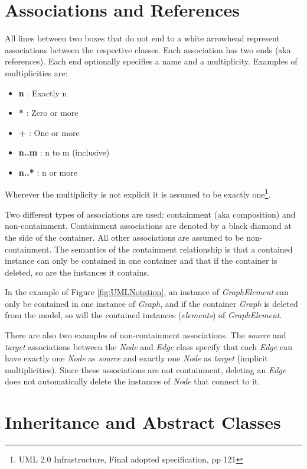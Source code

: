 \section{Associations and References}

All lines between two boxes that do not end to a white arrowhead represent associations between the respective classes. Each association has two ends (aka references). Each end optionally specifies a name and a multiplicity. Examples of multiplicities are:

\begin{itemize}
	\item \textbf{n} : Exactly n
	\item \textbf{*} : Zero or more
	\item \textbf{+} : One or more
	\item \textbf{n..m} : n to m (inclusive)
	\item \textbf{n..*} : n or more
\end{itemize}

Wherever the multiplicity is not explicit it is assumed to be exactly one\footnote{UML 2.0 Infrastructure, Final adopted specification, pp 121}.

Two different types of associations are used: containment (aka composition) and non-containment. Containment associations are denoted by a black diamond at the side of the container. All other associations are assumed to be non-containment. The semantics of the containment relationship is that a contained instance can only be contained in one container and that if the container is deleted, so are the instances it contains. 

In the example of Figure \ref{fig:UMLNotation}, an instance of \emph{GraphElement} can only be contained in one instance of \emph{Graph}, and if the container \emph{Graph} is deleted from the model, so will the contained instances (\emph{elements}) of \emph{GraphElement}.

There are also two examples of non-containment associations. The \emph{source} and \emph{target} associations between the \emph{Node} and \emph{Edge} class specify that each \emph{Edge} can have exactly one \emph{Node} as \emph{source} and exactly one \emph{Node} as \emph{target} (implicit multiplicities). Since these associations are not containment, deleting an \emph{Edge} does not automatically delete the instances of \emph{Node} that connect to it.

\section{Inheritance and Abstract Classes}

